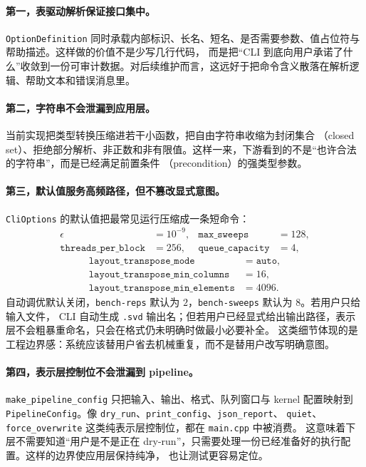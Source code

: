 \paragraph{第一，表驱动解析保证接口集中。}
\texttt{OptionDefinition} 同时承载内部标识、长名、短名、是否需要参数、值占位符与帮助描述。这样做的价值不是少写几行代码，
而是把“CLI 到底向用户承诺了什么”收敛到一份可审计数据。对后续维护而言，这远好于把命令含义散落在解析逻辑、帮助文本和错误消息里。

\paragraph{第二，字符串不会泄漏到应用层。}
当前实现把类型转换压缩进若干小函数，把自由字符串收缩为封闭集合
（closed set）、拒绝部分解析、非正数和非有限值。这样一来，下游看到的不是“也许合法的字符串”，而是已经满足前置条件
（precondition）的强类型参数。

\paragraph{第三，默认值服务高频路径，但不篡改显式意图。}
\texttt{CliOptions} 的默认值把最常见运行压缩成一条短命令：
\[
    \begin{aligned}
        \epsilon                     & = 10^{-9}, &
        \texttt{max\_sweeps}         & = 128,       \\
        \texttt{threads\_per\_block} & = 256,     &
        \texttt{queue\_capacity}     & = 4,
    \end{aligned}
\]
\[
    \begin{aligned}
        \texttt{layout\_transpose\_mode}          & = \texttt{auto}, \\
        \texttt{layout\_transpose\_min\_columns}  & = 16,            \\
        \texttt{layout\_transpose\_min\_elements} & = 4096.
    \end{aligned}
\]
自动调优默认关闭，\texttt{bench-reps} 默认为 $2$，\texttt{bench-sweeps} 默认为 $8$。若用户只给输入文件，
CLI 自动生成 \texttt{.svd} 输出名；但若用户已经显式给出输出路径，表示层不会粗暴重命名，只会在格式仍未明确时做最小必要补全。
这类细节体现的是工程边界感：系统应该替用户省去机械重复，而不是替用户改写明确意图。

\paragraph{第四，表示层控制位不会泄漏到 pipeline。}
\texttt{make\_pipeline\_config} 只把输入、输出、格式、队列窗口与 kernel 配置映射到
\texttt{PipelineConfig}。像 \texttt{dry\_run}、\texttt{print\_config}、\texttt{json\_report}、
\texttt{quiet}、\texttt{force\_overwrite} 这类纯表示层控制位，都在 \texttt{main.cpp} 中被消费。
这意味着下层不需要知道“用户是不是正在 dry-run”，只需要处理一份已经准备好的执行配置。这样的边界使应用层保持纯净，
也让测试更容易定位。

